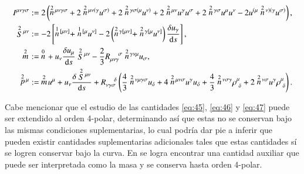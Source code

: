 \begin{align}
I^{\mu \nu \gamma \sigma} &:= 2\left( \des{2}{n}^{\mu \nu \gamma \sigma} + 2 \des{2}{n}^{\mu \nu (\gamma} u^{\sigma)} + 2\des{2}{n}^{\gamma \sigma (\mu} u^{\nu)} + 2\des{2}{n}^{\mu \nu} u^{\gamma} u^{\sigma} + 2\des{2}{n}^{\gamma \sigma} u^{\mu} u^{\nu} - 2 u^{(\mu} \des{2}{n}^{\nu)(\gamma} u^{\sigma)} \right),\\
\des{2}{S}^{\mu \nu} &:= -2 \left[ \des{1}{n}^{[\mu \nu]} + \des{1}{n}^{[\mu} u^{\nu]} - 2\left( \des{2}{n}^{\gamma [\mu \nu]} + \des{2}{n}^{\gamma [\mu} u^{\nu]} \right) \cd{u_{\gamma}} \right],\\
\des{2}{m} &:= \ \des{0}{n} + u_{\nu} \cd{u_{\mu}} \des{2}{S}^{\mu \nu} - \frac{2}{3} R_{\mu \nu \gamma}^{\ \ \ \ \sigma} \des{2}{n}^{\gamma \nu \mu} u_{\sigma},\\
\des{2}{p}^{\mu} &:= \ \des{2}{m} u^{\mu} + u_{\nu} \cd{\des{2}{S}^{\mu \nu}} + R_{\nu \gamma \sigma}^{\ \ \ \ \delta} \left( \frac{4}{3}\des{2}{n}^{\nu \mu \gamma \sigma} u_{\delta} + 4\des{2}{n}^{\mu \nu \sigma} u^{\gamma} u_{\delta} + \frac{4}{3} \des{2}{n}^{\nu \sigma \gamma} \rho^{\mu}_{\ \delta} + 2 \des{2}{n}^{\nu \sigma} u^{\gamma} \rho^{\mu}_{\ \delta} \right).
\end{align}

Cabe mencionar que el estudio de las cantidades \eqref{eq:45}, \eqref{eq:46} y \eqref{eq:47} puede ser extendido al orden 4-polar, determinando así que estas no se conservan bajo las mismas condiciones suplementarias, lo cual podría dar pie a inferir que pueden existir cantidades suplementarias adicionales tales que estas cantidades sí se logren conservar bajo la curva. En \cite{Steinhoff-Puetzfeld-2} se logra encontrar una cantidad auxiliar que puede ser interpretada como la masa y se conserva hasta orden 4-polar.